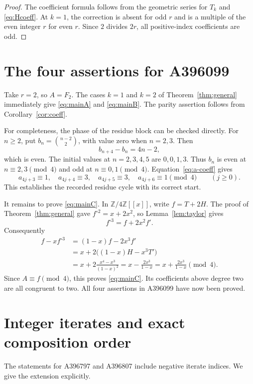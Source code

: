 \documentclass[11pt,a4paper]{article}
\theoremstyle{remark}
\newcommand{\Z}{\mathbb Z}
\begin{document}
\begin{proof}
The coefficient formula follows from the geometric series for $T_k$
and \eqref{eq:Hcoeff}. At $k=1$, the correction is absent for odd
$r$ and is a multiple of the even integer $r$ for even $r$.
Since $2$ divides $2r$, all positive-index coefficients are odd.
\end{proof}

\section{The four assertions for A396099}

Take $r=2$, so $A=F_2$. The cases $k=1$ and $k=2$ of
Theorem~\ref{thm:general} immediately give \eqref{eq:mainA} and
\eqref{eq:mainB}. The parity assertion follows from
Corollary~\ref{cor:coeff}.

For completeness, the phase of the residue block can be checked
directly. For $n\ge2$, put $b_n=\binom{n-2}{2}$, with value zero
when $n=2,3$. Then
\[
b_{n+4}-b_n=4n-2,
\]
which is even. The initial values at $n=2,3,4,5$ are $0,0,1,3$.
Thus $b_n$ is even at $n\equiv2,3\pmod4$ and odd at
$n\equiv0,1\pmod4$. Equation~\eqref{eq:a-coeff} gives
\[
a_{4j+3}\equiv1,\quad a_{4j+4}\equiv3,\quad
a_{4j+5}\equiv3,\quad a_{4j+6}\equiv1\pmod4
\qquad(j\ge0).
\]
This establishes the recorded residue cycle with its correct start.

It remains to prove \eqref{eq:mainC}. In $\Z/4\Z[[x]]$, write
$f=T+2H$. The proof of Theorem~\ref{thm:general} gave
$f^{\circ2}=x+2x^2$, so Lemma~\ref{lem:taylor} gives
\[
f^{\circ3}=f+2x^2f'.
\]
Consequently
\begin{align*}
f-xf^{\circ3}
&=(1-x)f-2x^3f'\\
&=x+2\bigl((1-x)H-x^3T'\bigr)\\
&=x+2\frac{x^4-x^3}{(1-x)^2}
=x-\frac{2x^3}{1-x}
=x+\frac{2x^3}{1-x}\pmod4.
\end{align*}
Since $A\equiv f\pmod4$, this proves \eqref{eq:mainC}. Its
coefficients above degree two are all congruent to two. All four
assertions in A396099 have now been proved.

\section{Integer iterates and exact composition order}\label{sec:integer}

The statements for A396797 and A396807 include negative iterate
indices. We give the extension explicitly.
\end{document}
